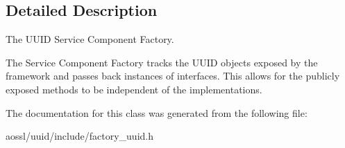 \subsection{Detailed Description}
The U\+U\+ID Service Component Factory. 

The Service Component Factory tracks the U\+U\+ID objects exposed by the framework and passes back instances of interfaces. This allows for the publicly exposed methods to be independent of the implementations. 

The documentation for this class was generated from the following file\+:\begin{DoxyCompactItemize}
\item 
aossl/uuid/include/factory\+\_\+uuid.\+h\end{DoxyCompactItemize}
